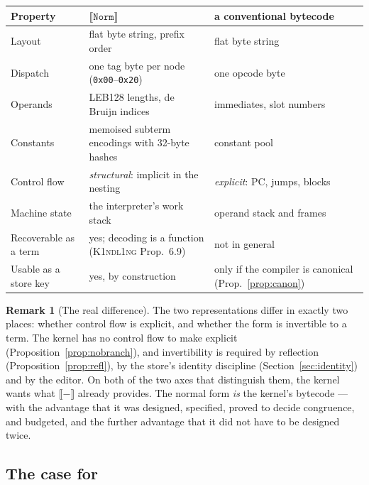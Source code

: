 \documentclass[11pt,a4paper]{article}
\newcommand{\code}[1]{\texttt{#1}}
\newcommand{\Kind}{\textsc{K1ndl1ng}}
\newcommand{\enc}[1]{\llbracket #1 \rrbracket}
\newcommand{\Norm}{\code{Norm}}
\theoremstyle{definition}
\newtheorem{remark}[definition]{Remark}
\theoremstyle{plain}
\begin{document}
\begin{center}
\begin{tabularx}{\linewidth}{@{}l>{\raggedright\arraybackslash}X>{\raggedright\arraybackslash}X@{}}
\toprule
Property & $\enc{\Norm}$ & a conventional bytecode\\
\midrule
Layout & flat byte string, prefix order & flat byte string\\
Dispatch & one tag byte per node (\code{0x00}--\code{0x20}) & one opcode byte\\
Operands & LEB128 lengths, de Bruijn indices & immediates, slot numbers\\
Constants & memoised subterm encodings with 32-byte hashes & constant pool\\
Control flow & \emph{structural}: implicit in the nesting & \emph{explicit}: PC, jumps, blocks\\
Machine state & the interpreter's work stack & operand stack and frames\\
Recoverable as a term & yes; decoding is a function (\Kind{} Prop.~6.9) & not in general\\
Usable as a store key & yes, by construction & only if the compiler is canonical (Prop.~\ref{prop:canon})\\
\bottomrule
\end{tabularx}
\end{center}

\begin{remark}[The real difference]
The two representations differ in exactly two places: whether control flow is
explicit, and whether the form is invertible to a term. The kernel has no
control flow to make explicit (Proposition~\ref{prop:nobranch}), and
invertibility is required by reflection (Proposition~\ref{prop:refl}), by the
store's identity discipline (Section~\ref{sec:identity}) and by the editor. On
both of the two axes that distinguish them, the kernel wants what $\enc{-}$
already provides. The normal form \emph{is} the kernel's bytecode --- with the
advantage that it was designed, specified, proved to decide congruence, and
budgeted, and the further advantage that it did not have to be designed twice.
\end{remark}

\subsection{The case for}
\end{document}
